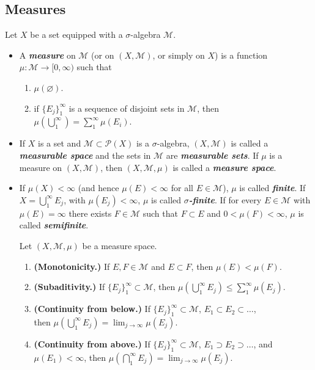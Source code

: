 \documentclass{article}
\theoremstyle{definition}
\numberwithin{equation}{section}
\begin{document}
	\subsection{Measures}
	Let $X$ be a set equipped with a $\sigma$-algebra $\mathcal{M}$.
	\begin{itemize}
		\item A \textbf{\textit{measure}} on $\mathcal{M}$ (or on $(X,\mathcal{M})$, or simply on $X$) is a function $\mu:\mathcal{M}\to [0,\infty)$ such that
		\begin{enumerate}
			\item $\mu(\varnothing)$.
			\item if $\{E_j\}_{1}^\infty$ is a sequence of disjoint sets in $\mathcal{M}$, then $\mu\left(\bigcup_{1}^\infty\right)=\sum_1^\infty\mu(E_i)$.
		\end{enumerate}
		\item If $X$ is a set and $\mathcal{M}\subset\mathcal{P}(X)$ is a $\sigma$-algebra, $(X,\mathcal{M})$ is called a \textbf{\textit{measurable space}} and the sets in $\mathcal{M}$ are \textbf{\textit{measurable sets}}. If $\mu$ is a measure on $(X,\mathcal{M})$, then $(X,\mathcal{M},\mu)$ is called a \textbf{\textit{measure space}}.
		\item If $\mu(X)<\infty$ (and hence $\mu(E)<\infty$ for all $E\in\mathcal{M}$), $\mu$ is called \textbf{\textit{finite}}. If $X=\bigcup_{1}^\infty E_j$, with $\mu(E_j)<\infty$, $\mu$ is called \textbf{\textit{$\sigma$-finite}}. If for every $E\in\mathcal{M}$ with $\mu(E)=\infty$ there exists $F\in\mathcal{M}$ such that $F\subset E$ and $0<\mu(F)<\infty$, $\mu$ is called \textbf{\textit{semifinite}}.
		\begin{thm}
			Let $(X,\mathcal{M},\mu)$ be a measure space.
			\begin{enumerate}
				\item \textbf{(Monotonicity.)} If $E,F\in\mathcal{M}$ and $E\subset F$, then $\mu(E)<\mu(F)$.
				\item \textbf{(Subaditivity.)} If $\{E_j\}_{1}^\infty\subset\mathcal{M}$, then $\mu\left(\bigcup_{1}^\infty E_j\right)\leq\sum_1^\infty\mu(E_j)$.
				\item \textbf{(Continuity from below.)} If $\{E_j\}_1^\infty\subset\mathcal{M}$, $E_1\subset E_2\subset\ldots$,\\ then $\mu(\bigcup_1^\infty E_j)=\lim_{j\to\infty}\mu(E_j)$.
				\item \textbf{(Continuity from above.)} If $\{E_j\}_1^\infty\subset\mathcal{M}$, $E_1\supset E_2\supset\ldots$, and $\mu(E_1)<\infty$, then $\mu(\bigcap_1^\infty E_j)=\lim_{j\to\infty}\mu(E_j)$.

\end{enumerate}
\end{thm}
\end{itemize}
\end{document}
